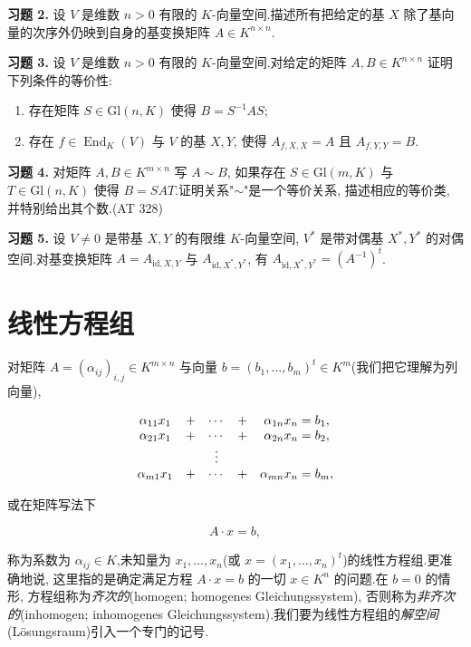 \noindent\textbf{习题 2.} 设 $V$ 是维数 $n > 0$ 有限的 $K$-向量空间.描述所有把给定的基 $X$ 除了基向量的次序外仍映到自身的基变换矩阵 $A \in K^{n \times n}$.

\noindent\textbf{习题 3.} 设 $V$ 是维数 $n > 0$ 有限的 $K$-向量空间.对给定的矩阵 $A, B \in K^{n \times n}$ 证明下列条件的等价性:
\begin{enumerate}
\item[(i)] 存在矩阵 $S \in \mathrm{Gl}(n, K)$ 使得 $B = S^{-1}AS$;
\item[(ii)] 存在 $f \in \operatorname{End}_K(V)$ 与 $V$ 的基 $X, Y$, 使得 $A_{f, X, X} = A$ 且 $A_{f, Y, Y} = B$.
\end{enumerate}

\noindent\textbf{习题 4.} 对矩阵 $A, B \in K^{m \times n}$ 写 $A \sim B$, 如果存在 $S \in \mathrm{Gl}(m, K)$ 与 $T \in \mathrm{Gl}(n, K)$ 使得 $B = SAT$.证明关系"$\sim$"是一个等价关系, 描述相应的等价类, 并特别给出其个数.(AT 328)

\noindent\textbf{习题 5.} 设 $V \neq 0$ 是带基 $X, Y$ 的有限维 $K$-向量空间, $V^*$ 是带对偶基 $X^*, Y^*$ 的对偶空间.对基变换矩阵 $A = A_{\mathrm{id}, X, Y}$ 与 $A_{\mathrm{id}, X^*, Y^*}$, 有 $A_{\mathrm{id}, X^*, Y^*} = (A^{-1})^t$.

\section{线性方程组}\label{sec:3.5}

对矩阵 $A = (\alpha_{ij})_{i, j} \in K^{m \times n}$ 与向量 $b = (b_1, \ldots, b_m)^t \in K^m$(我们把它理解为列向量),

\[
\begin{array}{c c c c c}
\alpha_{11}x_1 & + & \cdots & + & \alpha_{1n}x_n = b_1, \\
\alpha_{21}x_1 & + & \cdots & + & \alpha_{2n}x_n = b_2, \\
& & \vdots \\
\alpha_{m1}x_1 & + & \cdots & + & \alpha_{mn}x_n = b_m,
\end{array}
\]

或在矩阵写法下

\[
A \cdot x = b,
\]

称为系数为 $\alpha_{ij} \in K$,未知量为 $x_1, \ldots, x_n$(或 $x = (x_1, \ldots, x_n)^t$)的线性方程组.更准确地说, 这里指的是确定满足方程 $A \cdot x = b$ 的一切 $x \in K^n$ 的问题.在 $b = 0$ 的情形, 方程组称为\emph{齐次的}(\textup{homogen; homogenes Gleichungssystem}), 否则称为\emph{非齐次的}(\textup{inhomogen; inhomogenes Gleichungssystem}).我们要为线性方程组的\emph{解空间}(\textup{Lösungsraum})引入一个专门的记号.

